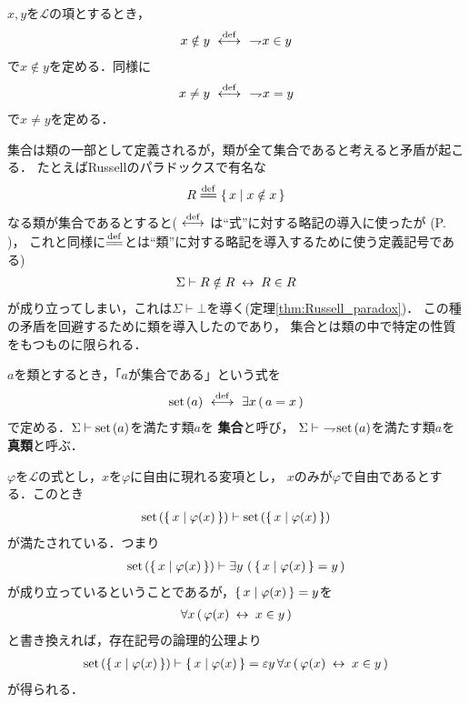 	$x,y$を$\mathcal{L}$の項とするとき，
	\begin{align}
		x \notin y \ \overset{\mathrm{def}}{\longleftrightarrow}\ \ \rightharpoondown\hspace{-0.25em} x \in y
	\end{align}
	で$x \notin y$を定める．同様に
	\begin{align}
		x \neq y \ \overset{\mathrm{def}}{\longleftrightarrow}\ \ \rightharpoondown\hspace{-0.25em} x = y
	\end{align}
	で$x \neq y$を定める．
	
	集合は類の一部として定義されるが，類が全て集合であると考えると矛盾が起こる．
	たとえばRussellのパラドックスで有名な
	\begin{align}
		R \defeq \Set{x}{x \notin x}
	\end{align}
	なる類が集合であるとすると($\ \overset{\mathrm{def}}{\longleftrightarrow}\ $は``式''に対する略記の導入に使ったが
	(P. \pageref{fom:defining_arrow})，
	これと同様に$\defeq$とは``類''に対する略記を導入するために使う定義記号である)
	\begin{align}
		\Sigma \vdash R \notin R \hspace{0.25em}\leftrightarrow\hspace{0.25em} R \in R
	\end{align}
	が成り立ってしまい，これは$\Sigma \vdash \bot$を導く(定理\ref{thm:Russell_paradox})．
	この種の矛盾を回避するために類を導入したのであり，
	集合とは類の中で特定の性質をもつものに限られる．
	
	\begin{screen}
		\begin{dfn}[集合]
			$a$を類とするとき，「$a$が集合である」という式を
			\begin{align}
				\operatorname*{set}\hspace{0.15em}(a) \ \overset{\mathrm{def}}{\longleftrightarrow}\  \exists x\, (\, a = x\, )
			\end{align}
			で定める．$\Sigma \vdash \operatorname*{set}\hspace{0.15em}(a)$を満たす類$a$を
			{\bf 集合}と呼び，
			$\Sigma \vdash\ \rightharpoondown\hspace{-0.25em} \operatorname*{set}\hspace{0.15em}(a)$を満たす類$a$を
			{\bf 真類}と呼ぶ．
		\end{dfn}
	\end{screen}
	
	$\varphi$を$\mathcal{L}$の式とし，$x$を$\varphi$に自由に現れる変項とし，
	$x$のみが$\varphi$で自由であるとする．このとき
	\begin{align}
		\operatorname*{set}\hspace{0.15em}(\{\, x \mid \varphi(x)\, \}) \vdash \operatorname*{set}\hspace{0.15em}(\{\, x \mid \varphi(x)\, \})
	\end{align}
	が満たされている．つまり
	\begin{align}
		\operatorname*{set}\hspace{0.15em}(\{\, x \mid \varphi(x)\, \})
		\vdash \exists y\, \left(\, \{\, x \mid \varphi(x)\, \} = y\, \right)
	\end{align}
	が成り立っているということであるが，$\{\, x \mid \varphi(x)\, \} = y$を
	\begin{align}
		\forall x\, (\, \varphi(x) \hspace{0.25em}\leftrightarrow\hspace{0.25em} x \in y\, )
	\end{align}
	と書き換えれば，存在記号の論理的公理より
	\begin{align}
		\operatorname*{set}\hspace{0.15em}(\{\, x \mid \varphi(x)\, \}) \vdash \{\, x \mid \varphi(x)\, \} = 
		\varepsilon y\, \forall x\, (\, \varphi(x) \hspace{0.25em}\leftrightarrow\hspace{0.25em} x \in y\, )
	\end{align}
	が得られる．
	
